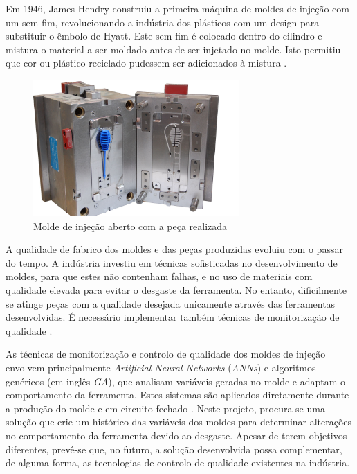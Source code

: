 \documentclass[11pt,twoside,a4paper]{report}
\begin{document}
Em 1946, James Hendry construiu a primeira máquina de moldes de injeção com um sem fim, revolucionando a indústria dos plásticos com um design para substituir o êmbolo de Hyatt. Este sem fim é colocado dentro do cilindro e mistura o material a ser moldado antes de ser injetado no molde. Isto permitiu que cor ou plástico reciclado pudessem ser adicionados à mistura \cite{historia,patente1946}.\par
\begin{figure}[H]
	\begin{center}
		\includegraphics[width=0.70\textwidth]{molde} %
		\caption[Molde de injeção]{Molde de injeção aberto com a peça realizada \footnotemark}
		\label{fig:molde}
	\end{center}
\end{figure}
A qualidade de fabrico dos moldes e das peças produzidas evoluiu com o passar do tempo. A indústria investiu em técnicas sofisticadas no desenvolvimento de moldes, para que estes não contenham falhas, e no uso de materiais com qualidade elevada para evitar o desgaste da ferramenta. No entanto, dificilmente se atinge peças com a qualidade desejada unicamente através das ferramentas desenvolvidas. É necessário implementar também técnicas de monitorização de qualidade \cite{Woll}.\par 
As técnicas de monitorização e controlo de qualidade dos moldes de injeção envolvem principalmente \textit{Artificial Neural Networks} (\textit{ANNs}) e algoritmos genéricos (em inglês \textit{GA}), que analisam variáveis geradas no molde e adaptam o comportamento da ferramenta. Estes sistemas são aplicados diretamente durante a produção do molde e em circuito fechado \cite{Woll,Cook}. Neste projeto, procura-se uma solução que crie um histórico das variáveis dos moldes para determinar alterações no comportamento da ferramenta devido ao desgaste. Apesar de terem objetivos diferentes, prevê-se que, no futuro, a solução desenvolvida possa complementar, de alguma forma, as tecnologias de controlo de qualidade existentes na indústria.
\end{document}
